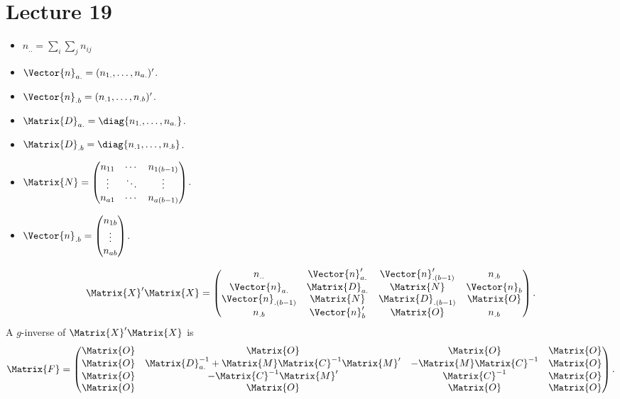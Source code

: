 \section{Lecture 19}
\begin{itemize}
    \item $ n_{..}=\sum_{i}\sum_j n_{ij} $
    \item $ \Vector{n}_{a.}=(n_{1.},\ldots,n_{a.})' $.
    \item $ \Vector{n}_{.b}=(n_{.1},\ldots,n_{.b})' $.
    \item $ \Matrix{D}_{a.}=\diag{n_{1.},\ldots,n_{a.}} $.
    \item $ \Matrix{D}_{.b}=\diag{n_{.1},\ldots,n_{.b}} $.
    \item $ \Matrix{N}=\begin{pmatrix}
                  n_{11} & \cdots & n_{1(b-1)} \\
                  \vdots & \ddots & \vdots     \\
                  n_{a1} & \cdots & n_{a(b-1)}
              \end{pmatrix} $.
    \item $ \Vector{n}_{.b}=\begin{pmatrix}
                  n_{1b} \\
                  \vdots \\
                  n_{ab}
              \end{pmatrix} $.
\end{itemize}
\[ \Matrix{X}'\Matrix{X}=\begin{pmatrix}
        n_{..}              & \Vector{n}_{a.}' & \Vector{n}_{.(b-1)}' & n_{.b}       \\
        \Vector{n}_{a.}     & \Matrix{D}_{a.}  & \Matrix{N}           & \Vector{n}_b \\
        \Vector{n}_{.(b-1)} & \Matrix{N}       & \Matrix{D}_{.(b-1)}  & \Matrix{O}   \\
        n_{.b}              & \Vector{n}_{b}'  & \Matrix{O}           & n_{.b}
    \end{pmatrix}. \]
A $ g $-inverse of $ \Matrix{X}'\Matrix{X} $ is
\[ \Matrix{F}=\begin{pmatrix}
        \Matrix{O} & \Matrix{O}                                                & \Matrix{O}                 & \Matrix{O} \\
        \Matrix{O} & \Matrix{D}_{a.}^{-1}+\Matrix{M}\Matrix{C}^{-1}\Matrix{M}' & -\Matrix{M}\Matrix{C}^{-1} & \Matrix{O} \\
        \Matrix{O} & -\Matrix{C}^{-1}\Matrix{M}'                               & \Matrix{C}^{-1}            & \Matrix{O} \\
        \Matrix{O} & \Matrix{O}                                                & \Matrix{O}                 & \Matrix{O} \\
    \end{pmatrix}. \]
